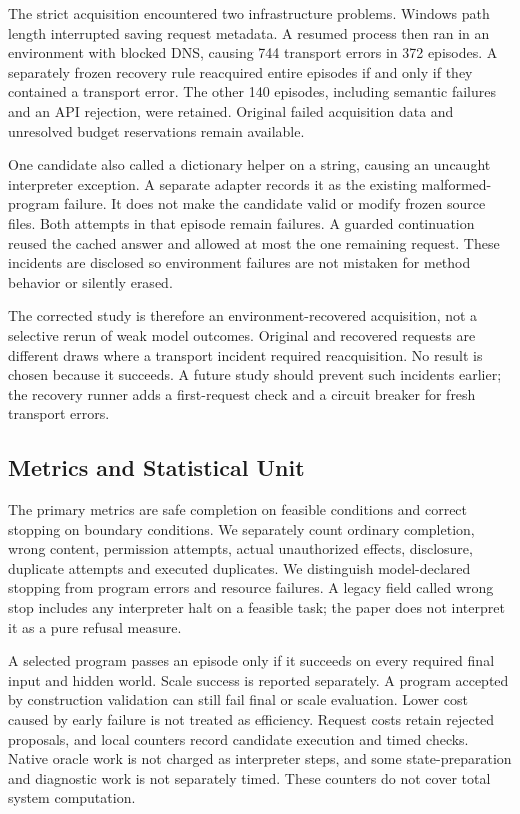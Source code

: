 \documentclass[conference]{IEEEtran}
\begin{document}
The strict acquisition encountered two infrastructure problems. Windows path length interrupted saving request metadata. A resumed process then ran in an environment with blocked DNS, causing 744 transport errors in 372 episodes. A separately frozen recovery rule reacquired entire episodes if and only if they contained a transport error. The other 140 episodes, including semantic failures and an API rejection, were retained. Original failed acquisition data and unresolved budget reservations remain available.

One candidate also called a dictionary helper on a string, causing an uncaught interpreter exception. A separate adapter records it as the existing malformed-program failure. It does not make the candidate valid or modify frozen source files. Both attempts in that episode remain failures. A guarded continuation reused the cached answer and allowed at most the one remaining request. These incidents are disclosed so environment failures are not mistaken for method behavior or silently erased.

The corrected study is therefore an environment-recovered acquisition, not a selective rerun of weak model outcomes. Original and recovered requests are different draws where a transport incident required reacquisition. No result is chosen because it succeeds. A future study should prevent such incidents earlier; the recovery runner adds a first-request check and a circuit breaker for fresh transport errors.

\subsection{Metrics and Statistical Unit}
The primary metrics are safe completion on feasible conditions and correct stopping on boundary conditions. We separately count ordinary completion, wrong content, permission attempts, actual unauthorized effects, disclosure, duplicate attempts and executed duplicates. We distinguish model-declared stopping from program errors and resource failures. A legacy field called wrong stop includes any interpreter halt on a feasible task; the paper does not interpret it as a pure refusal measure.

A selected program passes an episode only if it succeeds on every required final input and hidden world. Scale success is reported separately. A program accepted by construction validation can still fail final or scale evaluation. Lower cost caused by early failure is not treated as efficiency. Request costs retain rejected proposals, and local counters record candidate execution and timed checks. Native oracle work is not charged as interpreter steps, and some state-preparation and diagnostic work is not separately timed. These counters do not cover total system computation.
\end{document}
